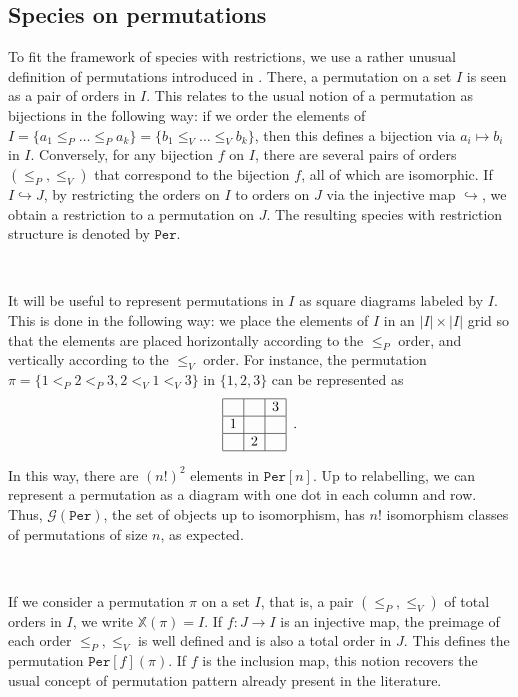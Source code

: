 \documentclass[12pt, reqno]{amsart}
\theoremstyle{definition}
\begin{document}
\subsection{Species on permutations\label{sec:speciespermutation}}

To fit the framework of species with restrictions, we use a rather unusual definition of permutations introduced in \cite{albert2020two}.
There, a permutation on a set $I$ is seen as a pair of orders in $I$.
This relates to the usual notion of a permutation as bijections in the following way: if we order the elements of $I = \{a_1 \leq_P \dots \leq_P a_k \} = \{ b_1 \leq_V \dots \leq_V b_k \}$, then this defines a bijection via $a_i \mapsto b_i $ in $I$.
Conversely, for any bijection $f$ on $I$, there are several pairs of orders $(\leq_P, \leq_V)$ that correspond to the bijection $f$, all of which are isomorphic.
If $I \hookrightarrow J$, by restricting the orders on $I$ to orders on $J$ via the injective map $\hookrightarrow $, we obtain a restriction to a permutation on $J$.
The resulting species with restriction structure is denoted by $\mathtt{Per}$.

\

It will be useful to represent permutations in $I$ as square diagrams labeled by $I$.
This is done in the following way: we place the elements of $I$ in an $|I| \times |I|$ grid so that the elements are placed horizontally according to the $\leq_P$ order, and vertically according to the $\leq_V$ order.
For instance, the permutation $\pi = \{1<_P2<_P3 , 2<_V1<_V3\}$ in $\{1, 2, 3\}$ can be represented as 
\begin{equation}
\begin{array}{|c|c|c|}
	\hline & & 3 \\
    \hline 1 & &  \\
    \hline & 2 & \\
    \hline 
\end{array}\, \, \, .
\end{equation}

In this way, there are $(n!)^2 $ elements in $\mathtt{Per}[n]$.
Up to relabelling, we can represent a permutation as a diagram with one dot in each column and row.
Thus, $\mathcal{G}(\mathtt{Per})$, the set of objects up to isomorphism, has $n!$ isomorphism classes of permutations of size $n$, as expected.

\

\label{defin:per}
If we consider a permutation $\pi$ on a set $I$, that is, a pair $(\leq_P, \leq_V) $ of total orders in $I$, we write $\mathbb{X}(\pi) = I$.
If $f:J \to I $ is an injective map, the preimage of each order $\leq_P, \leq_V$ is well defined and is also a total order in $J$.
This defines the permutation $\mathtt{Per}[f](\pi )$.
If $f$ is the inclusion map, this notion recovers the usual concept of permutation pattern already present in the literature.
\end{document}
